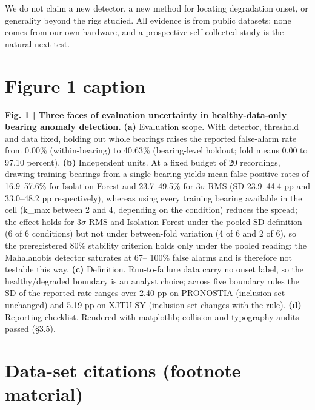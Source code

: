 \documentclass[11pt]{article}
\begin{document}
We do not claim a new detector, a new method for locating degradation onset, or generality beyond the rigs studied. All evidence is from public datasets; none comes from our own hardware, and a prospective self-collected study is the natural next test.



\section{Figure 1 caption}

\textbf{Fig. 1 | Three faces of evaluation uncertainty in healthy-data-only bearing anomaly detection.} \textbf{(a)} Evaluation scope. With detector, threshold and data fixed, holding out whole bearings raises the reported false-alarm rate from 0.00\% (within-bearing) to 40.63\% (bearing-level holdout; fold means 0.00 to 97.10 percent). \textbf{(b)} Independent units. At a fixed budget of 20 recordings, drawing training bearings from a single bearing yields mean false-positive rates of 16.9--57.6\% for Isolation Forest and 23.7--49.5\% for 3$\sigma$ RMS (SD 23.9--44.4 pp and 33.0--48.2 pp respectively), whereas using every training bearing available in the cell (k\_max between 2 and 4, depending on the condition) reduces the spread; the effect holds for 3$\sigma$ RMS and Isolation Forest under the pooled SD definition (6 of 6 conditions) but not under between-fold variation (4 of 6 and 2 of 6), so the preregistered 80\% stability criterion holds only under the pooled reading; the Mahalanobis detector saturates at 67-- 100\% false alarms and is therefore not testable this way. \textbf{(c)} Definition. Run-to-failure data carry no onset label, so the healthy/degraded boundary is an analyst choice; across five boundary rules the SD of the reported rate ranges over 2.40 pp on PRONOSTIA (inclusion set unchanged) and 5.19 pp on XJTU-SY (inclusion set changes with the rule). \textbf{(d)} Reporting checklist. Rendered with matplotlib; collision and typography audits passed (\S3.5).



\section{Data-set citations (footnote material)}
\end{document}
